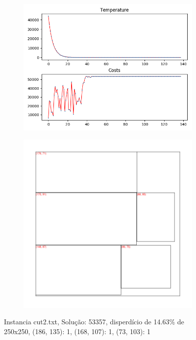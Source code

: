 \begin{figure}
\centering
\begin{subfigure}{.5\textwidth}
  \centering
  \includegraphics[width=1\linewidth]{results/cut2/2/plot}
  \label{fig:sub1}
\end{subfigure}%
\begin{subfigure}{.5\textwidth}
  \centering
  \includegraphics[width=1\linewidth]{results/cut2/2/cut}
  \label{fig:sub2}
\end{subfigure}
\caption{Instancia cut2.txt, Solução: 53357, disperdício de 14.63\% de 250x250, {(186, 135): 1, (168, 107): 1, (73, 103): 1}}
\label{fig:test}
\end{figure}


